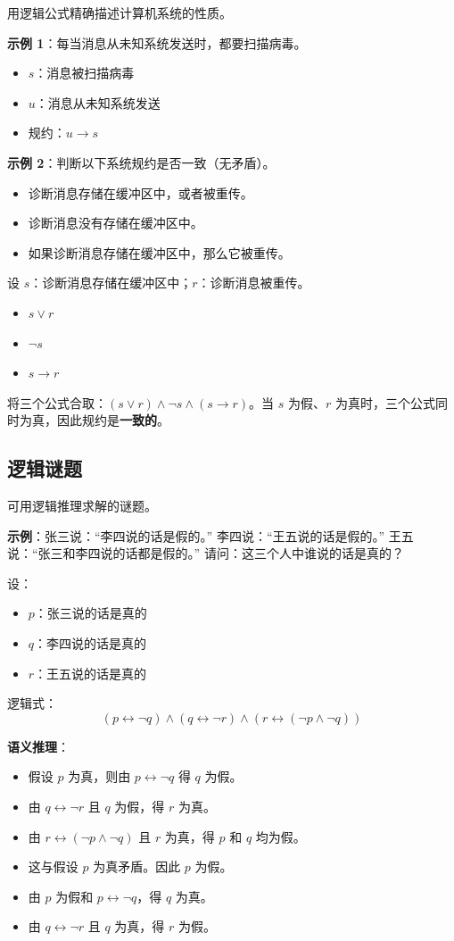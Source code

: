 \documentclass[UTF8,11pt,a4paper]{ctexbook}   %
\theoremstyle{definition}
\begin{document}
用逻辑公式精确描述计算机系统的性质。

\textbf{示例 1}：每当消息从未知系统发送时，都要扫描病毒。
\begin{itemize}
    \item $s$：消息被扫描病毒
    \item $u$：消息从未知系统发送
    \item 规约：$u \rightarrow s$
\end{itemize}

\textbf{示例 2}：判断以下系统规约是否一致（无矛盾）。
\begin{itemize}
    \item 诊断消息存储在缓冲区中，或者被重传。
    \item 诊断消息没有存储在缓冲区中。
    \item 如果诊断消息存储在缓冲区中，那么它被重传。
\end{itemize}

设 $s$：诊断消息存储在缓冲区中；$r$：诊断消息被重传。
\begin{itemize}
    \item $s \lor r$
    \item $\neg s$
    \item $s \rightarrow r$
\end{itemize}

将三个公式合取：$(s \lor r) \land \neg s \land (s \rightarrow r)$。当 $s$ 为假、$r$ 为真时，三个公式同时为真，因此规约是\textbf{一致的}。

\subsection{逻辑谜题}

可用逻辑推理求解的谜题。

\textbf{示例}：张三说：``李四说的话是假的。'' 李四说：``王五说的话是假的。'' 王五说：``张三和李四说的话都是假的。'' 请问：这三个人中谁说的话是真的？

设：
\begin{itemize}
    \item $p$：张三说的话是真的
    \item $q$：李四说的话是真的
    \item $r$：王五说的话是真的
\end{itemize}

逻辑式：
\[
(p \leftrightarrow \neg q) \land (q \leftrightarrow \neg r) \land (r \leftrightarrow (\neg p \land \neg q))
\]

\textbf{语义推理}：
\begin{itemize}
    \item 假设 $p$ 为真，则由 $p \leftrightarrow \neg q$ 得 $q$ 为假。
    \item 由 $q \leftrightarrow \neg r$ 且 $q$ 为假，得 $r$ 为真。
    \item 由 $r \leftrightarrow (\neg p \land \neg q)$ 且 $r$ 为真，得 $p$ 和 $q$ 均为假。
    \item 这与假设 $p$ 为真矛盾。因此 $p$ 为假。
    \item 由 $p$ 为假和 $p \leftrightarrow \neg q$，得 $q$ 为真。
    \item 由 $q \leftrightarrow \neg r$ 且 $q$ 为真，得 $r$ 为假。
\end{itemize}
\end{document}
